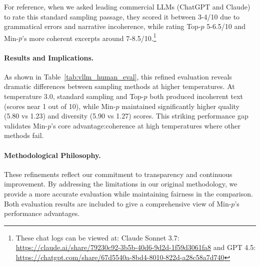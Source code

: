 \documentclass{article}
\begin{document}
For reference, when we asked leading commercial LLMs (ChatGPT and Claude) to rate this standard sampling passage, they scored it between 3-4/10 due to grammatical errors and narrative incoherence, while rating Top-\(p\) 5-6.5/10 and Min-\( p \)'s more coherent excerpts around 7-8.5/10.\footnote{These chat logs can be viewed at: Claude Sonnet 3.7: \url{https://claude.ai/share/79230c92-3b5b-40d6-9d2d-1f59d3061fa8} and GPT 4.5: \url{https://chatgpt.com/share/67d5540a-8bd4-8010-822d-a28c58a7d740}}

\paragraph{Results and Implications.} As shown in Table~\ref{tab:vllm_human_eval}, this refined evaluation reveals dramatic differences between sampling methods at higher temperatures. At temperature 3.0, standard sampling and Top-\(p\) both produced incoherent text (scores near 1 out of 10), while Min-\(p\) maintained significantly higher quality (5.80 vs 1.23) and diversity (5.90 vs 1.27) scores. This striking performance gap validates Min-\(p\)'s core advantage:coherence at high temperatures where other methods fail.

\paragraph{Methodological Philosophy.} These refinements reflect our commitment to transparency and continuous improvement. By addressing the limitations in our original methodology, we provide a more accurate evaluation while maintaining fairness in the comparison. Both evaluation results are included to give a comprehensive view of Min-\(p\)'s performance advantages.
\end{document}
